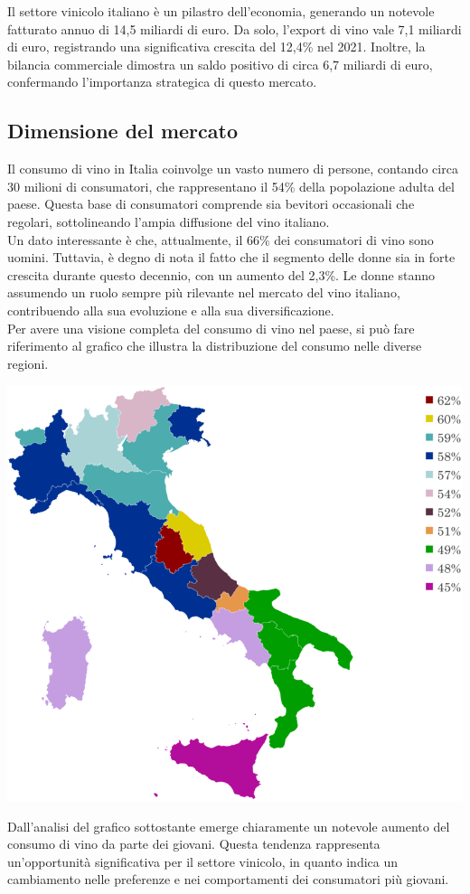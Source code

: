 \documentclass[12pt, a4paper]{article}
\newcommand{\meskip}{\medskip \\}
\begin{document}
Il settore vinicolo italiano è un pilastro dell'economia, generando un notevole fatturato annuo di 14,5 miliardi di euro. Da solo, l'export di vino vale 7,1 miliardi di euro, registrando una significativa crescita del 12,4\% nel 2021. Inoltre, la bilancia commerciale dimostra un saldo positivo di circa 6,7 miliardi di euro, confermando l'importanza strategica di questo mercato.

\subsection{Dimensione del mercato}
Il consumo di vino in Italia coinvolge un vasto numero di persone, contando circa 30 milioni di consumatori, che rappresentano il 54\% della popolazione adulta del paese. Questa base di consumatori comprende sia bevitori occasionali che regolari, sottolineando l'ampia diffusione del vino italiano.\\
Un dato interessante è che, attualmente, il 66\% dei consumatori di vino sono uomini. Tuttavia, è degno di nota il fatto che il segmento delle donne sia in forte crescita durante questo decennio, con un aumento del 2,3\%. Le donne stanno assumendo un ruolo sempre più rilevante nel mercato del vino italiano, contribuendo alla sua evoluzione e alla sua diversificazione.\\
Per avere una visione completa del consumo di vino nel paese, si può fare riferimento al grafico che illustra la distribuzione del consumo nelle diverse regioni.
\begin{center}
    \includegraphics[width=.62\textwidth]{images/grafico_consumatori_regioni.png}
\end{center}
\noindent Dall'analisi del grafico sottostante emerge chiaramente un notevole aumento del consumo di vino da parte dei giovani. Questa tendenza rappresenta un'opportunità significativa per il settore vinicolo, in quanto indica un cambiamento nelle preferenze e nei comportamenti dei consumatori più giovani.\meskip
\end{document}
